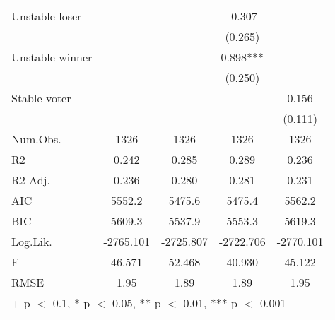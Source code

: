 \begin{table}
\begin{tabular}[t]{lcccc}
Unstable loser &  &  & -0.307 & \\
 &  &  & (0.265) & \\
Unstable winner &  &  & 0.898*** & \\
 &  &  & (0.250) & \\
Stable voter &  &  &  & 0.156\\
 &  &  &  & (0.111)\\
\midrule
Num.Obs. & 1326 & 1326 & 1326 & 1326\\
R2 & 0.242 & 0.285 & 0.289 & 0.236\\
R2 Adj. & 0.236 & 0.280 & 0.281 & 0.231\\
AIC & 5552.2 & 5475.6 & 5475.4 & 5562.2\\
BIC & 5609.3 & 5537.9 & 5553.3 & 5619.3\\
Log.Lik. & -2765.101 & -2725.807 & -2722.706 & -2770.101\\
F & 46.571 & 52.468 & 40.930 & 45.122\\
RMSE & 1.95 & 1.89 & 1.89 & 1.95\\
\bottomrule
\multicolumn{5}{l}{\rule{0pt}{1em}+ p $<$ 0.1, * p $<$ 0.05, ** p $<$ 0.01, *** p $<$ 0.001}\\
\end{tabular}
\end{table}
